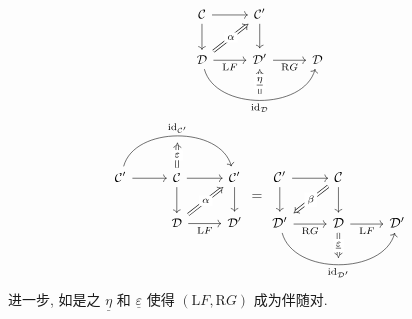 \begin{theorem}
\begin{equation*}
\begin{gathered}
\begin{tikzcd}[every cell/.append style = {font = \small}]
			\mathcal{C} \arrow[r] \arrow[d] & \mathcal{C}' \arrow[d] & \\
			\mathcal{D} \arrow[r, "{\mathrm{L}F}"'] \arrow[rr, bend right=75, "{\identity_{\mathcal{D}}}"', "" {name=I}] \arrow[Rightarrow, ru, "\alpha" description] & \mathcal{D}' \arrow[r, "{\mathrm{R}G}"'] \arrow[Rightarrow, from=I, "\underline{\eta}" description] & \mathcal{D}
		\end{tikzcd} \\
		\begin{tikzcd}[every cell/.append style = {font = \small}]
			\mathcal{C}' \arrow[r] \arrow[bend left=75, rr, "{\identity_{\mathcal{C}'}}", ""' {name=I}] & \mathcal{C} \arrow[r] \arrow[d] \arrow[Rightarrow, to=I, "\varepsilon" description] & \mathcal{C}' \arrow[d] \\
			& \mathcal{D} \arrow[r, "{\mathrm{L}F}"'] \arrow[Rightarrow, ru, "\alpha" description] & \mathcal{D}'
		\end{tikzcd} = \begin{tikzcd}
			\mathcal{C}' \arrow[r] \arrow[d] & \mathcal{C} \arrow[d] \arrow[Rightarrow, ld, "\beta" description] & \\
			\mathcal{D}' \arrow[r, "{\mathrm{R}G}"'] \arrow[rr, bend right=75, "{\identity_{\mathcal{D}'}}"', "" {name=I}] & \mathcal{D} \arrow[r, "{\mathrm{L}F}"'] \arrow[Rightarrow, to=I, "\underline{\varepsilon}" description] & \mathcal{D}'
		\end{tikzcd}
	\end{gathered}\end{equation*}
	进一步, 如是之 $\underline{\eta}$ 和 $\underline{\varepsilon}$ 使得 $(\mathrm{L}F, \mathrm{R}G)$ 成为伴随对.
\end{theorem}
